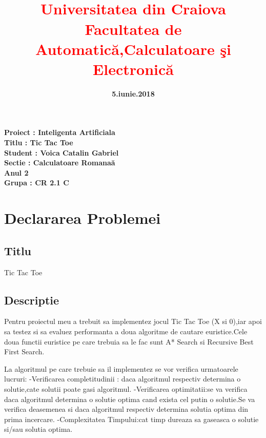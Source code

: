 \documentclass[12]{article}
\begin{document}
\title{\textbf{\\
\textcolor{red}{Universitatea din Craiova \\Facultatea de Automatic\u{a},Calculatoare \c{s}i Electronic\u{a}}}}
\date{\textbf{5.iunie.2018}}
\maketitle
\begin{center}
\end{center}
\textbf{Proiect : Inteligenta Artificiala} \\
\textbf{Titlu : Tic Tac Toe }\\
\textbf{Student : Voica Catalin Gabriel} \\
\textbf{Sectie : Calculatoare Romana\u{a}\\ Anul 2\\ Grupa : CR 2.1 C}
\newpage
\tableofcontents

\newpage
\section{Declararea Problemei}

\textcolor{white}{}
\subsection{Titlu}
Tic Tac Toe

\subsection{Descriptie}
\textcolor{white}{}


Pentru proiectul meu a trebuit sa implementez jocul Tic Tac Toe (X si  0),iar apoi sa testez si sa  evaluez performanta a doua algoritme de cautare euristice.Cele doua functii euristice pe care trebuia sa le fac sunt A* Search si Recursive Best First Search.
\newline
\newline

La algoritmul pe care trebuie sa il implementez se vor verifica urmatoarele lucruri:
-Verificarea completitudinii : daca algoritmul respectiv determina o solutie,cate solutii poate gasi algoritmul.
-Verificarea optimitatii:se va verifica daca algoritmul determina o solutie optima cand exista cel putin o solutie.Se va verifica deasemenea si daca algoritmul respectiv determina solutia optima din prima incercare.
-Complexitatea Timpului:cat timp dureaza sa gaseasca o solutie si/sau solutia optima.
\newline
\newline
\end{document}

